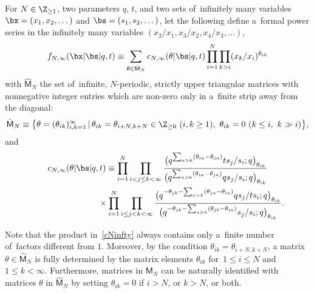 \begin{Definition}
\label{def2}
For $N\in\Z_{\geq 1}$, two parameters $q$, $t$, and two sets of~infinitely many variables $\bx=(x_1,x_2,\dots)$ and $\bs=(s_1,s_2,\dots)$, let the following define a~formal power series in the infinitely many variables
$(x_2/x_1,x_3/x_2,x_4/x_3,\dots)$,
\begin{gather}
\label{fNinfty}
 f_{N,\infty}(\bx|\bs|q,t) \equiv \sum_{\theta\in\hat{\mathsf{M}}_N} c_{N,\infty}(\theta|\bs|q,t) \prod_{i=1}^N \prod_{k>i} (x_k/x_i)^{\theta_{ik}}
\end{gather}
with $\hat{\mathsf{M}}_N$ the set of~infinite, $N$-periodic, strictly upper triangular matrices with nonnegative integer entries which are non-zero only in a~finite strip away from the diagonal:
\begin{gather}
\label{hMMN}
\hat{\mathsf{M}}_N\equiv \big\{ \theta=(\theta_{ik})_{i,k=1}^\infty\,|\, \theta_{ik}=\theta_{i+N,k+N}\in\Z_{\geq 0}\ (i,k\geq 1), \ \theta_{ik}=0\ (k\leq i,\ k\gg i)\big\} ,
\end{gather}
and
\begin{gather}
c_{N,\infty}(\theta|\bs|q,t)
\equiv
\prod_{i=1}^N \prod_{i< j\leq k< \infty}
\frac{\big(q^{\sum_{a> k}(\theta_{ia} - \theta_{ja})}ts_{j}/s_i;q\big)_{\theta_{ik}}}{\big(q^{\sum_{a> k}(\theta_{ia} - \theta_{ja})}qs_{j}/s_i;q\big)_{\theta_{ik}}}\nonumber
\\ \hphantom{c_{N,\infty}(\theta|\bs|q,t)\equiv }
{}\times\prod_{i=1}^N \prod_{i\leq j<k<\infty}
\frac{\big(q^{-\theta_{jk}-\sum_{a>k}(\theta_{ja}-\theta_{ia})}qs_{j}/ts_i ;q\big)_{\theta_{ik}}}{\big(q^{-\theta_{jk}-\sum_{a>k}(\theta_{jb}-\theta_{ia})}s_{j}/s_i ;q\big)_{\theta_{ik}}} .
\label{cNinfty}
\end{gather}

\end{Definition}

Note that the product in~\eqref{cNinfty} always contains only a~finite number of~factors different from $1$. Moreover, by the condition $\theta_{ik}=\theta_{i+N,k+N}$,
a matrix $\theta\in\hat{\mathsf{M}}_N$ is fully determined by the matrix elements $\theta_{ik}$ for~$1\leq i\leq N$ and $1\leq k<\infty$.
Furthermore, matrices in $\mathsf{M}_N$ can be naturally identified with matrices $\theta$ in $\hat{\mathsf{M}}_N$ by setting $\theta_{ik}=0$ if $i>N$, or $k>N$, or both.
